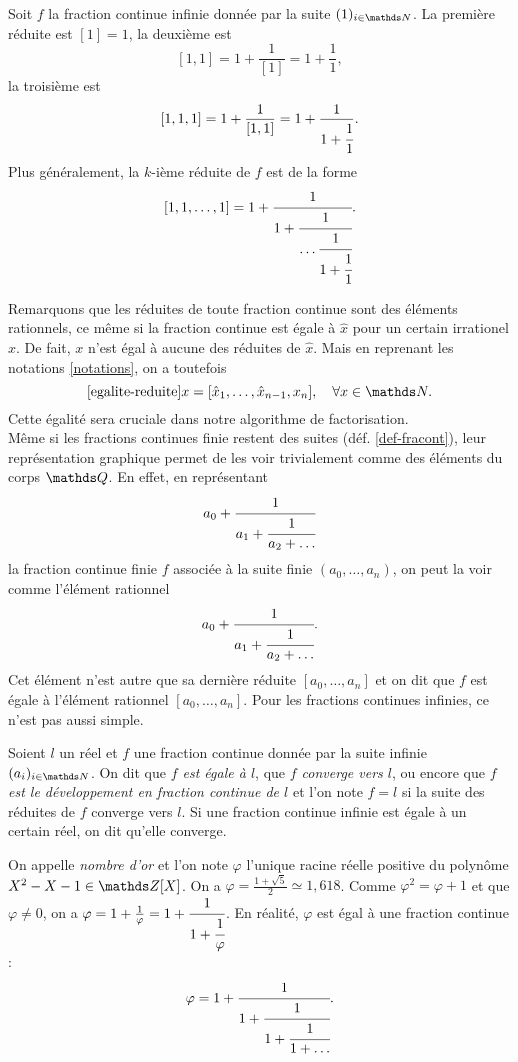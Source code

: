 \begin{exemple}
	Soit $f$ la fraction continue infinie donnée par la suite $(1)_{i\in \N}$.
	La première réduite est $[1] = 1$, la deuxième est \[[1, 1] = 1 +
	\frac{1}{[1]} = 1 + \frac{1}{1},\] la troisième est \[[1, 1, 1] = 1 +
	\frac{1}{[1, 1]} = 1 + \frac{1}{1 + \cfrac{1}{1}}.\] Plus généralement, la
	$k$-ième réduite de $f$ est de la forme \[[1, 1, \dots, 1] = 1 +
	\cfrac{1}{1 + \cfrac{1}{\dots \\ \cfrac{1}{1 +
	\cfrac{1}{1}}}}.\]
\end{exemple}

Remarquons que les réduites de toute fraction continue sont des éléments
rationnels, ce même si la fraction continue est égale à $\hat{x}$ pour un
certain irrationel $x$. De fait, $x$ n'est égal à aucune des réduites de
$\hat{x}$. Mais en reprenant les notations \ref{notations}, on a toutefois
\begin{equation} \ref{egalite-reduite}
	x = [\hat{x}_1, \dots, \hat{x}_{n-1}, x_n], \quad \forall x\in \N.
\end{equation}
Cette égalité sera cruciale dans notre algorithme de factorisation. \\

Même si les fractions continues finie restent des suites (déf.
\ref{def-fracont}), leur représentation graphique permet de les voir
trivialement comme des éléments du corps $\Q$. En effet, en représentant \[a_0
+ \cfrac{1}{a_1 + \cfrac{1}{a_2 + \dots}}\] la fraction continue finie $f$
associée à la suite finie $(a_0, \dots, a_n)$, on peut la voir comme l'élément
rationnel \[a_0 + \cfrac{1}{a_1 + \cfrac{1}{a_2 + \dots}}.\] Cet élément n'est
autre que sa dernière réduite $[a_0, \dots, a_n]$ et on dit que $f$ est égale à
l'élément rationnel $[a_0, \dots, a_n]$. Pour les fractions continues infinies,
ce n'est pas aussi simple.

\begin{definition}
	Soient $l$ un réel et $f$ une fraction continue donnée par la suite infinie
	$(a_i)_{i\in \N}$. On dit que \emph{$f$ est égale à $l$}, que \emph{$f$
	converge vers $l$}, ou encore que \emph{$f$ est le développement en
	fraction continue de $l$} et l'on note $f = l$ si la suite des réduites de
	$f$ converge vers $l$. Si une fraction continue infinie est égale à un
	certain réel, on dit qu'elle converge.
\end{definition}

\begin{exemple}[Nombre d'or]
	On appelle \emph{nombre d'or} et l'on note $\varphi$ l'unique racine réelle
	positive du polynôme $X^2 - X - 1 \in \Z[X]$. On a $\varphi =\frac{1 +
	\sqrt{5}}{2} \simeq 1, 618$. Comme $\varphi^2 = \varphi + 1$ et que
	$\varphi \neq 0$, on a $\varphi = 1 + \frac{1}{\varphi} = 1 + \cfrac{1}{1 +
	\cfrac{1}{\varphi}}$. En réalité, $\varphi$ est égal à une fraction
	continue : \[\varphi = 1 + \cfrac{1}{1 + \cfrac{1}{1 + \cfrac{1}{1 +
	\dots}}}.\]
\end{exemple}

